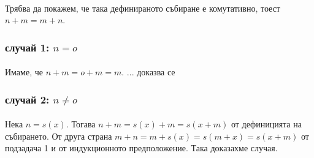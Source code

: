 \documentclass[12pt]{article}
\begin{document}
\paragraph*{}
Трябва да покажем, че така дефинираното събиране е комутативно, тоест $n+m=m+n$.
\subsubsection*{случай 1: $n=o$}
\paragraph*{}
Имаме, че $n+m = o+m = m$. ... доказва се 
\subsubsection*{случай 2: $n \neq o$}
\paragraph*{}
Нека $n = s(x)$. Тогава $n+m = s(x) + m = s(x+m)$ от дефиницията на събирането. От друга страна $m+n = m + s(x) = s(m+x) = s(x+m)$ от подзадача 1 и от индукционното предположение. Така доказахме случая. 
\end{document}
